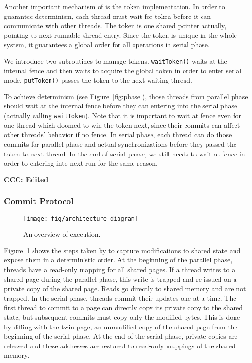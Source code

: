 Another important mechanism of \dthreads{} is the token implementation. 
In order to guarantee determinism, each thread must wait for token
before it can communicate with other threads. 
The token is one shared pointer actually, pointing to next runnable thread entry.
Since the token is unique in the whole system, it guarantees a global order for
all operations in serial phase. 

We introduce two subroutines to manage tokens. \texttt{waitToken()}
waits at the internal fence and then waits to acquire the global token
in order to enter serial mode. \texttt{putToken()} passes the token to
the next waiting thread.

To achieve determinism (see Figure~\ref{fig:phase}), those threads from parallel phase 
should wait at the internal fence before they can entering into the serial phase (actually calling
\texttt{waitToken}).
Note that it is important to wait at fence even for one thread which doomed to win the token next,
since their commits can affect other threads' behavior if no fence.
In serial phase, each thread can do those commits for parallel phase and actual synchronizations
before they passed the token to next thread. 
In the end of serial phase, we still needs to wait at fence in order to entering into next run for the same reason.


\textbf{CCC: Edited}

\subsubsection{Commit Protocol}
\begin{figure}
{\centering
\texttt{[image: fig/architecture-diagram]}
\caption{An overview of \dthreads{} execution.\label{fig:architecture}}
}
\end{figure}

Figure~\ref{fig:architecture} shows the steps taken by \dthreads{} to capture modifications to shared state and expose them in a deterministic order.  At the beginning of the parallel phase, threads have a read-only mapping for all shared pages.  If a thread writes to a shared page during the parallel phase, this write is trapped and re-issued on a private copy of the shared page.  Reads go directly to shared memory and are not trapped.  In the serial phase, threads commit their updates one at a time.  The first thread to commit to a page can directly copy its private copy to the shared state, but subsequent commits must copy only the modified bytes.  This is done by diffing with the twin page, an unmodified copy of the shared page from the beginning of the serial phase.  At the end of the serial phase, private copies are released and these addresses are restored to read-only mappings of the shared memory.

